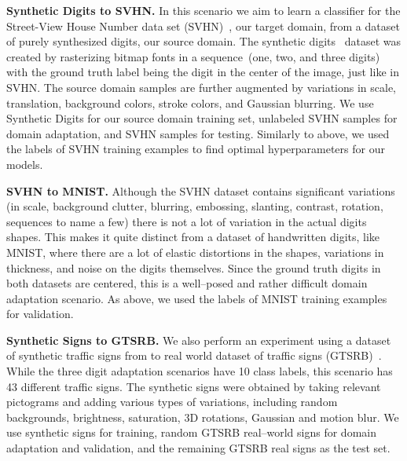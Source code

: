 \documentclass{article}
\begin{document}
\textbf{Synthetic Digits to SVHN.}  In this scenario we aim to learn a classifier for the Street-View House Number data set (SVHN)~\cite{netzer2011reading}, our target domain, from a dataset of purely synthesized digits, our source domain. The synthetic digits~\cite{ganin2016domain} dataset was created by rasterizing bitmap fonts in a sequence~(one, two, and three digits) with the ground truth label being the digit in the center of the image, just like in SVHN. The source domain samples are further augmented by variations in scale, translation, background colors, stroke colors, and Gaussian blurring. We use  Synthetic Digits for our source domain training set,  unlabeled SVHN samples for domain adaptation, and  SVHN samples for testing.  Similarly to above, we used the labels of  SVHN training examples to find optimal hyperparameters for our models. 

\textbf{SVHN to MNIST.}  Although the SVHN dataset contains significant variations (in scale, background clutter, blurring, embossing, slanting, contrast, rotation, sequences to name a few) there is not a lot of variation in the actual digits shapes. This makes it quite distinct from a dataset of handwritten digits, like MNIST, where there are a lot of elastic distortions in the shapes, variations in thickness, and noise on the digits themselves. Since the ground truth digits in both datasets are centered, this is a well--posed and rather difficult domain adaptation scenario. As above, we used the labels of  MNIST training examples for validation.

\textbf{Synthetic Signs to GTSRB.} We also perform an experiment using a dataset of synthetic traffic signs from \cite{Moiseev2013} to real world dataset of traffic signs (GTSRB)~\cite{stallkamp2012gtsrb}. While the three digit adaptation scenarios have 10 class labels, this scenario has 43 different traffic signs. The synthetic signs were obtained by taking relevant pictograms and adding various types of variations, including random backgrounds, brightness, saturation, 3D rotations, Gaussian and motion blur. We use  synthetic signs for training,  random GTSRB real--world signs for domain adaptation and validation, and the remaining  GTSRB real signs as the test set.
\end{document}
